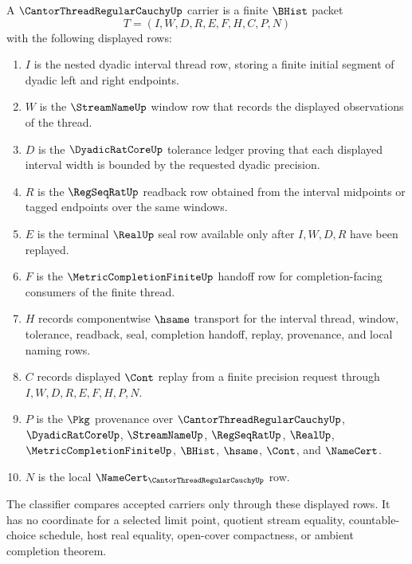 \begin{definition}
\label{def:cantor-thread-regular-cauchy-carrier}
A $\CantorThreadRegularCauchyUp$ carrier is a finite $\BHist$ packet
$$
T=(I,W,D,R,E,F,H,C,P,N)
$$
with the following displayed rows:
\begin{enumerate}
\item $I$ is the nested dyadic interval thread row, storing a finite initial segment of dyadic left and right endpoints.
\item $W$ is the $\StreamNameUp$ window row that records the displayed observations of the thread.
\item $D$ is the $\DyadicRatCoreUp$ tolerance ledger proving that each displayed interval width is bounded by the requested dyadic precision.
\item $R$ is the $\RegSeqRatUp$ readback row obtained from the interval midpoints or tagged endpoints over the same windows.
\item $E$ is the terminal $\RealUp$ seal row available only after $I,W,D,R$ have been replayed.
\item $F$ is the $\MetricCompletionFiniteUp$ handoff row for completion-facing consumers of the finite thread.
\item $H$ records componentwise $\hsame$ transport for the interval thread, window, tolerance, readback, seal, completion handoff, replay, provenance, and local naming rows.
\item $C$ records displayed $\Cont$ replay from a finite precision request through $I,W,D,R,E,F,H,P,N$.
\item $P$ is the $\Pkg$ provenance over $\CantorThreadRegularCauchyUp$, $\DyadicRatCoreUp$, $\StreamNameUp$, $\RegSeqRatUp$, $\RealUp$, $\MetricCompletionFiniteUp$, $\BHist$, $\hsame$, $\Cont$, and $\NameCert$.
\item $N$ is the local $\NameCert_{\CantorThreadRegularCauchyUp}$ row.
\end{enumerate}
The classifier compares accepted carriers only through these displayed rows. It has no coordinate for a selected limit point, quotient stream equality, countable-choice schedule, host real equality, open-cover compactness, or ambient completion theorem.
\end{definition}

